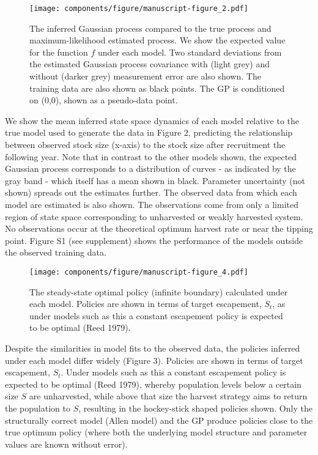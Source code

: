 \documentclass[author-year, 12pt,review]{components/elsarticle} %
\makeatletter
\def\maxwidth{\ifdim\Gin@nat@width>\linewidth\linewidth
\else\Gin@nat@width\fi}
\let\Oldincludegraphics\includegraphics
\renewcommand{\includegraphics}[1]{\Oldincludegraphics[width=\maxwidth]{#1}}
\makeatother
\begin{document}
\begin{figure}[htbp]
\centering
\texttt{[image: components/figure/manuscript-figure\_2.pdf]}
\caption{The inferred Gaussian process compared to the true process and
maximum-likelihood estimated process. We show the expected value for the
function $f$ under each model. Two standard deviations from the
estimated Gaussian process covariance with (light grey) and without
(darker grey) measurement error are also shown. The training data are
also shown as black points. The GP is conditioned on (0,0), shown as a
pseudo-data point.}
\end{figure}

We show the mean inferred state space dynamics of each model relative to
the true model used to generate the data in Figure 2, predicting the
relationship between observed stock size (x-axis) to the stock size
after recruitment the following year. Note that in contrast to the other
models shown, the expected Gaussian process corresponds to a
distribution of curves - as indicated by the gray band - which itself
has a mean shown in black. Parameter uncertainty (not shown) spreads out
the estimates further. The observed data from which each model are
estimated is also shown. The observations come from only a limited
region of state space corresponding to unharvested or weakly harvested
system. No observations occur at the theoretical optimum harvest rate or
near the tipping point. Figure S1 (see supplement) shows the performance
of the models outside the observed training data.

\begin{figure}[htbp]
\centering
\texttt{[image: components/figure/manuscript-figure\_4.pdf]}
\caption{The steady-state optimal policy (infinite boundary) calculated
under each model. Policies are shown in terms of target escapement,
$S_t$, as under models such as this a constant escapement policy is
expected to be optimal (Reed 1979).}
\end{figure}

Despite the similarities in model fits to the observed data, the
policies inferred under each model differ widely (Figure 3). Policies
are shown in terms of target escapement, $S_t$. Under models such as
this a constant escapement policy is expected to be optimal (Reed 1979),
whereby population levels below a certain size $S$ are unharvested,
while above that size the harvest strategy aims to return the population
to $S$, resulting in the hockey-stick shaped policies shown. Only the
structurally correct model (Allen model) and the GP produce policies
close to the true optimum policy (where both the underlying model
structure and parameter values are known without error).
\end{document}
